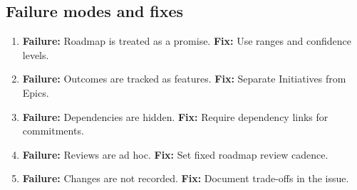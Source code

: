 \subsection{Failure modes and fixes}
\begin{enumerate}
  \item \textbf{Failure:} Roadmap is treated as a promise. \textbf{Fix:} Use ranges and confidence levels.
  \item \textbf{Failure:} Outcomes are tracked as features. \textbf{Fix:} Separate Initiatives from Epics.
  \item \textbf{Failure:} Dependencies are hidden. \textbf{Fix:} Require dependency links for commitments.
  \item \textbf{Failure:} Reviews are ad hoc. \textbf{Fix:} Set fixed roadmap review cadence.
  \item \textbf{Failure:} Changes are not recorded. \textbf{Fix:} Document trade-offs in the issue.
\end{enumerate}










